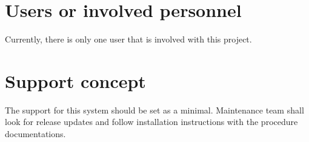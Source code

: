 \section{Users or involved personnel}
\label{loc:Users or involved personnel}
% 

Currently, there is only one user that is involved with this project.


\section{Support concept}
\label{loc:Support concept}
% 

The support for this system should be set as a minimal. Maintenance team shall look for release updates and follow installation instructions with the procedure documentations.
